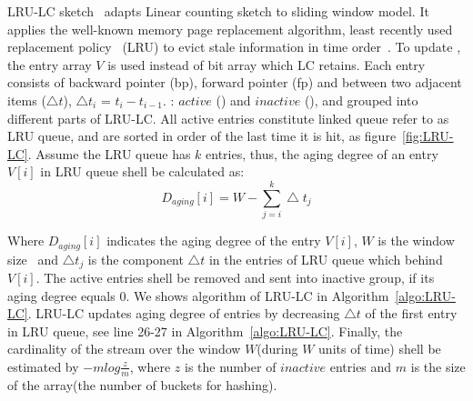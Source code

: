 LRU-LC sketch~\cite{shan2016lru} adapts Linear counting sketch to sliding window
model. It applies the well-known memory page replacement algorithm, least
recently used replacement policy~\cite{o1993lru} (LRU) to evict stale
information in time order~\cite{shan2016lru}. To update , the entry array $V$ is used instead of bit array
which LC retains. Each entry consists of backward pointer (bp), forward
pointer (fp) and   between two adjacent items ($\bigtriangleup t$),
$\bigtriangleup t_i$ = $t_i - t_{i-1}$. : $active$ () and $inactive$  (), and
grouped into different parts of LRU-LC. All active entries constitute linked
queue refer to as LRU queue, and are sorted in order of the last time it is hit,
as figure~\ref{fig:LRU-LC}. Assume the LRU queue has $k$ entries, thus, the
aging degree of an entry $V[i]$ in LRU queue shell be calculated as:
\begin{equation*}
   D_{aging}[i] = W-\sum_{j=i}^{k}\bigtriangleup t_j
\end{equation*}

Where $D_{aging}[i]$ indicates the aging degree of the entry $V[i]$, $W$ is the
window size~\cite{shan2016lru} and $\bigtriangleup t_j$ is the component
$\bigtriangleup t$ in the entries of LRU queue which behind $V[i]$. The active
entries shell be removed and sent into inactive group, if its aging degree
equals 0. We shows algorithm of LRU-LC in Algorithm~\ref{algo:LRU-LC}. LRU-LC
updates aging degree of entries by decreasing $\bigtriangleup t$ of the first
entry in LRU queue, see line 26-27 in Algorithm~\ref{algo:LRU-LC}. Finally, the
cardinality of the stream over the window $W$(during $W$ units of time) shell be
estimated by $ -mlog\frac{z}{m}$, where $z$ is the number of $inactive$ entries
and $m$ is the size of the array(the number of buckets for hashing).


